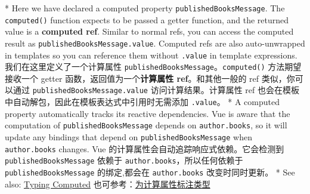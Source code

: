 \begin{paracol}{2}
\switchcolumn[0]*%
Here we have declared a computed property
\texttt{publishedBooksMessage}. The \texttt{computed()} function expects
to be passed a getter function, and the returned value is a
\textbf{computed ref}. Similar to normal refs, you can access the
computed result as \texttt{publishedBooksMessage.value}. Computed refs
are also auto-unwrapped in templates so you can reference them without
\texttt{.value} in template expressions.
\switchcolumn
我们在这里定义了一个计算属性
\texttt{publishedBooksMessage}。\texttt{computed()} 方法期望接收一个
getter 函数，返回值为一个\textbf{计算属性 ref}。和其他一般的 ref
类似，你可以通过 \texttt{publishedBooksMessage.value}
访问计算结果。计算属性 ref
也会在模板中自动解包，因此在模板表达式中引用时无需添加 \texttt{.value}。
\switchcolumn[0]*%
A computed property automatically tracks its reactive dependencies. Vue
is aware that the computation of \texttt{publishedBooksMessage} depends
on \texttt{author.books}, so it will update any bindings that depend on
\texttt{publishedBooksMessage} when \texttt{author.books} changes.
\switchcolumn
Vue 的计算属性会自动追踪响应式依赖。它会检测到
\texttt{publishedBooksMessage} 依赖于 \texttt{author.books}，所以任何依赖于 \texttt{publishedBooksMessage}
的绑定,都会在 \texttt{author.books} 改变时同时更新。
\switchcolumn[0]*%
See also:
\href{https://vuejs.org/guide/typescript/composition-api.html\#typing-computed}{Typing
Computed}
\switchcolumn
也可参考：\href{https://cn.vuejs.org/guide/typescript/composition-api.html\#typing-computed}{为计算属性标注类型}
\end{paracol}


